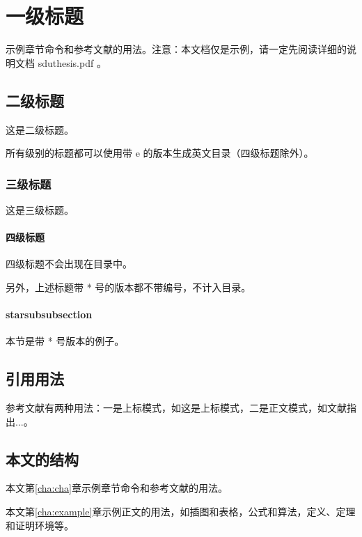 
\chapter{一级标题}
\label{cha:cha}
示例章节命令和参考文献的用法。注意：本文档仅是示例，请一定先阅读详细的说明文档 sduthesis.pdf 。


\section{二级标题}
这是二级标题。

所有级别的标题都可以使用带 e 的版本生成英文目录（四级标题除外）。

\subsection{三级标题}
这是三级标题。

\subsubsection{四级标题}
四级标题不会出现在目录中。

另外，上述标题带 * 号的版本都不带编号，不计入目录。

\subsubsection*{starsubsubsection}
本节是带 * 号版本的例子。


\section{引用用法}
参考文献有两种用法：一是上标模式，如这是上标模式\cite{cnproceed}，二是正文模式，如文献指出...。

\section{本文的结构}
本文第\ref{cha:cha}章示例章节命令和参考文献的用法。

本文第\ref{cha:example}章示例正文的用法，如插图和表格，公式和算法，定义、定理和证明环境等。

